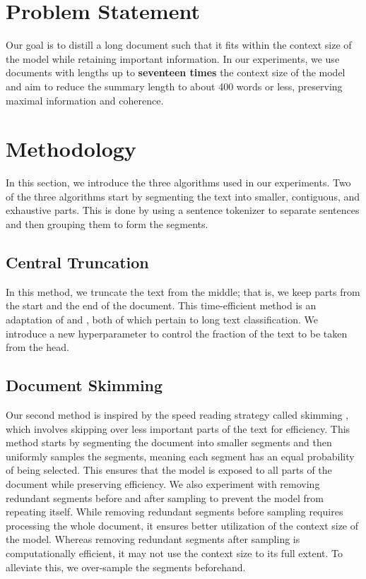 \documentclass[letterpaper]{article} %
\begin{document}
\section{Problem Statement}

Our goal is to distill a long document such that it fits within the context size of the model while retaining important information.
In our experiments, we use documents with lengths up to \textbf{seventeen times} the context size of the model and aim to reduce the summary length to about 400 words or less, preserving maximal information and coherence.


\section{Methodology}

In this section, we introduce the three algorithms used in our experiments.
Two of the three algorithms start by segmenting the text into smaller, contiguous, and exhaustive parts.
This is done by using a sentence tokenizer to separate sentences and then grouping them to form the segments.

\subsection{Central Truncation}

In this method, we truncate the text from the middle; that is, we keep parts from the start and the end of the document.
This time-efficient method is an adaptation of \citet{worsham-kalita-2018-genre} and \citet{sun2019fine}, both of which pertain to long text classification.
We introduce a new hyperparameter to control the fraction of the text to be taken from the head.

\subsection{Document Skimming}

Our second method is inspired by the speed reading strategy called skimming \cite{dhillon2020effect}, which involves skipping over less important parts of the text for efficiency.
This method starts by segmenting the document into smaller segments and then uniformly samples the segments, meaning each segment has an equal probability of being selected.
This ensures that the model is exposed to all parts of the document while preserving efficiency.
We also experiment with removing redundant segments before and after sampling to prevent the model from repeating itself.
While removing redundant segments before sampling requires processing the whole document, it ensures better utilization of the context size of the model.
Whereas removing redundant segments after sampling is computationally efficient, it may not use the context size to its full extent.
To alleviate this, we over-sample the segments beforehand.
\end{document}
